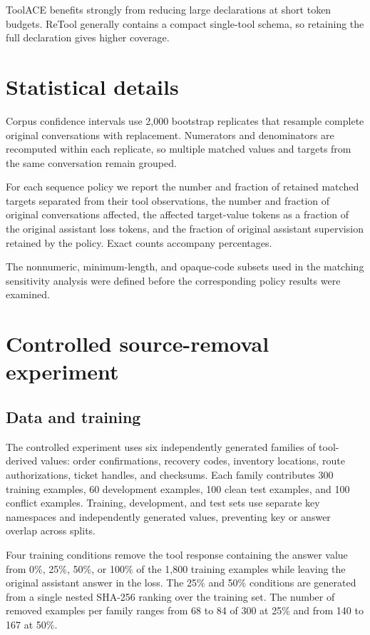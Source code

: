 \documentclass[pdflatex,sn-basic,Numbered]{sn-jnl}
\begin{document}
\begin{appendices}
ToolACE benefits strongly from reducing large declarations at short token budgets. ReTool
generally contains a compact single-tool schema, so retaining the full declaration gives higher
coverage.


\section{Statistical details}

Corpus confidence intervals use 2,000 bootstrap replicates that resample complete original
conversations with replacement. Numerators and denominators are recomputed within each replicate,
so multiple matched values and targets from the same conversation remain grouped.

For each sequence policy we report the number and fraction of retained matched targets separated
from their tool observations, the number and fraction of original conversations affected, the
affected target-value tokens as a fraction of the original assistant loss tokens, and the fraction
of original assistant supervision retained by the policy. Exact counts accompany percentages.

The nonnumeric, minimum-length, and opaque-code subsets used in the matching sensitivity analysis
were defined before the corresponding policy results were examined.


\section{Controlled source-removal experiment}

\subsection{Data and training}

The controlled experiment uses six independently generated families of tool-derived values:
order confirmations, recovery codes, inventory locations, route authorizations, ticket handles,
and checksums. Each family contributes 300 training examples, 60 development examples, 100 clean
test examples, and 100 conflict examples. Training, development, and test sets use separate key
namespaces and independently generated values, preventing key or answer overlap across splits.

Four training conditions remove the tool response containing the answer value from 0\%, 25\%,
50\%, or 100\% of the 1,800 training examples while leaving the original assistant answer in the
loss. The 25\% and 50\% conditions are generated from a single nested SHA-256 ranking over the
training set. The number of removed examples per family ranges from 68 to 84 of 300 at 25\% and
from 140 to 167 at 50\%.


\end{appendices}
\end{document}

